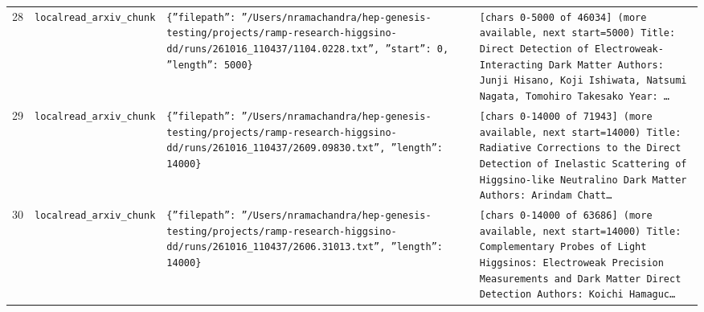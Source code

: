 \documentclass[11pt,a4paper]{article}
\begin{document}
\begin{longtable}{@{}p{}p{}p{}p{}@{}}
28 & \texttt{local}\newline\texttt{read\_\allowbreak{}arxiv\_\allowbreak{}chunk} & \texttt{\{''filepath'':\allowbreak{} ''/\allowbreak{}Users/\allowbreak{}nramachandra/\allowbreak{}hep-genesis-testing/\allowbreak{}projects/\allowbreak{}ramp-research-higgsino-dd/\allowbreak{}runs/\allowbreak{}261016\_\allowbreak{}110437/\allowbreak{}1104.0228.txt'',\allowbreak{} ''start'':\allowbreak{} 0,\allowbreak{} ''length'':\allowbreak{} 5000\}\allowbreak{}} & \texttt{[chars 0-5000 of 46034]\allowbreak{} (more available,\allowbreak{} next start=\allowbreak{}5000)\allowbreak{}  Title:\allowbreak{} Direct Detection of Electroweak-Interacting Dark Matter Authors:\allowbreak{} Junji Hisano,\allowbreak{} Koji Ishiwata,\allowbreak{} Natsumi Nagata,\allowbreak{} Tomohiro Takesako Year:\allowbreak{} \ldots{}\allowbreak{}} \\
29 & \texttt{local}\newline\texttt{read\_\allowbreak{}arxiv\_\allowbreak{}chunk} & \texttt{\{''filepath'':\allowbreak{} ''/\allowbreak{}Users/\allowbreak{}nramachandra/\allowbreak{}hep-genesis-testing/\allowbreak{}projects/\allowbreak{}ramp-research-higgsino-dd/\allowbreak{}runs/\allowbreak{}261016\_\allowbreak{}110437/\allowbreak{}2609.09830.txt'',\allowbreak{} ''length'':\allowbreak{} 14000\}\allowbreak{}} & \texttt{[chars 0-14000 of 71943]\allowbreak{} (more available,\allowbreak{} next start=\allowbreak{}14000)\allowbreak{}  Title:\allowbreak{} Radiative Corrections to the Direct Detection of Inelastic Scattering of Higgsino-like Neutralino Dark Matter Authors:\allowbreak{} Arindam Chatt\ldots{}\allowbreak{}} \\
30 & \texttt{local}\newline\texttt{read\_\allowbreak{}arxiv\_\allowbreak{}chunk} & \texttt{\{''filepath'':\allowbreak{} ''/\allowbreak{}Users/\allowbreak{}nramachandra/\allowbreak{}hep-genesis-testing/\allowbreak{}projects/\allowbreak{}ramp-research-higgsino-dd/\allowbreak{}runs/\allowbreak{}261016\_\allowbreak{}110437/\allowbreak{}2606.31013.txt'',\allowbreak{} ''length'':\allowbreak{} 14000\}\allowbreak{}} & \texttt{[chars 0-14000 of 63686]\allowbreak{} (more available,\allowbreak{} next start=\allowbreak{}14000)\allowbreak{}  Title:\allowbreak{} Complementary Probes of Light Higgsinos:\allowbreak{} Electroweak Precision Measurements and Dark Matter Direct Detection Authors:\allowbreak{} Koichi Hamaguc\ldots{}\allowbreak{}} \\

\end{longtable}
\end{document}
